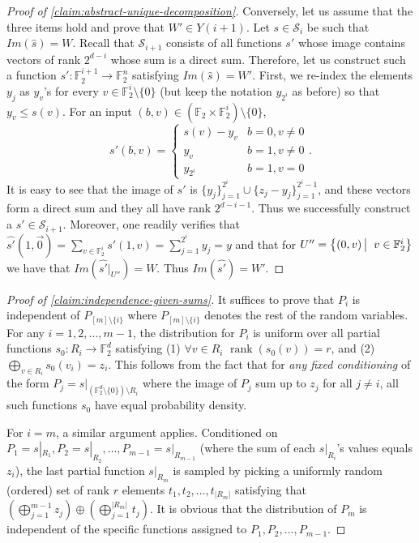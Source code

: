 \documentclass[10pt,a4paper]{article}
\newcommand{\prettyref}[1]{\cref{#1}}
\theoremstyle{definition}
\theoremstyle{remark}
\newcommand\sett[2]{\left\{ #1 \left| \; \vphantom{#1 #2} \right. #2  \right\}}
\newcommand{\set}[1]{\{#1\}}
\newcommand{\F}{\mathbb{F}}
\DeclareMathOperator{\rank}{rank}
\renewcommand{\leq}{\leqslant}
\numberwithin{equation}{section}
\let\pref=\prettyref
\def\Y{Y}
\begin{document}
\begin{proof}[Proof of \pref{claim:abstract-unique-decomposition}]
\medskip

Conversely, let us assume that the three items hold and prove that \(W' \in \Y(i+1)\). Let \(s \in \mathcal{S}_i\) be such that \(Im(\widehat{s})=W\). Recall that \(\mathcal{S}_{i+1}\) consists of all functions \(s'\) whose image contains vectors of rank \(2^{d-i}\) whose sum is a direct sum. Therefore, let us construct such a function \(s':\F_2^{i+1} \to \F_2^n\) satisfying \(Im(\widehat{s})=W'\). First, we re-index the elements \(y_j\) as \(y_v\)'s for every \(v \in \F_2^{i} \setminus \set{0}\) (but keep the notation \(y_{2^i}\) as before) so that \(y_v \leq s(v)\). For an input \((b,v)\in (\F_2 \times \F_2^{i}) \setminus \set{0}\),
    \[s'(b,v) = \begin{cases} 
    s(v)-y_v & b=0,v\ne 0 \\
    y_v & b=1, v \ne 0 \\
    y_{2^i} & b=1,v=0 \end{cases}.\]
It is easy to see that the image of \(s'\) is \(\set{y_j}_{j=1}^{2^i} \cup \set{z_j - y_j}_{j=1}^{2^i - 1}\), and these vectors form a direct sum and they all have rank \(2^{d-i-1}\). Thus we successfully construct a \(s' \in \mathcal{S}_{i+1}\). Moreover, one readily verifies that \(\widehat{s'}(1,\vec{0}) = \sum_{v \in \F_2^i} s'(1,v) = \sum_{j=1}^{2^i} y_j = y\) and that for \(U'' = \sett{(0,v)}{v \in \F_2^i}\) we have that \(Im(\widehat{s'}|_{U''}) = W\). Thus \(Im(\widehat{s'}) = W'\).
\end{proof}


\begin{proof}[Proof of \pref{claim:independence-given-sums}]
    It suffices to prove that \(P_i\) is independent of \(P_{[m] \setminus \set{i}}\) where \(P_{[m] \setminus \set{i}}\) denotes the rest of the random variables. For any \(i =1,2,\dots,m-1 \), the distribution for $P_i$ is uniform over all partial functions \(s_0:R_i \to \F_2^d\) satisfying (1) $\forall v \in R_i$ \(\rank(s_0(v))=r\), and (2) \(\bigoplus_{v \in R_i}s_0(v_i) = z_i\). This follows from the fact that for \emph{any fixed conditioning} of the form \(P_j = s|_{(\F_2^d \setminus \set{0}) \setminus R_i}\) where the image of $P_j$ sum up to \(z_j\) for all \(j \ne i\), all such functions \(s_0\) have equal probability density.

    For \(i=m\), a similar argument applies. Conditioned on \(P_1 = s|_{R_1},P_2 =s|_{R_2},\dots,P_{m-1} = s|_{R_{m-1}}\) (where the sum of each $s|_{R_i}$'s values equals \(z_i\)), the last partial function \(s|_{R_m}\) is sampled by picking a uniformly random (ordered) set of rank \(r\) elements \(t_1,t_2,\dots,t_{|R_m|}\) satisfying that \(\left (\bigoplus_{j=1}^{m-1} z_j \right ) \oplus \left ( \bigoplus_{j=1}^{|R_m|} t_j \right )\). It is obvious that the distribution of $P_m$ is independent of the specific functions assigned to \(P_1,P_2,\dots,P_{m-1}\).
\end{proof}
\end{document}
